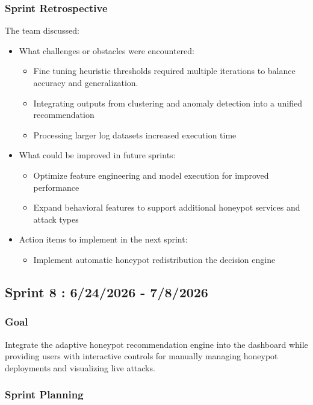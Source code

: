 \documentclass{article}
\begin{document}
\subsubsection{Sprint Retrospective}
The team discussed:

\begin{itemize}
    \item What challenges or obstacles were encountered:
    \begin{itemize}
        \item Fine tuning heuristic thresholds required multiple iterations to balance accuracy and generalization.
        \item Integrating outputs from clustering and anomaly detection into a unified recommendation 
        \item Processing larger log datasets increased execution time 
    \end{itemize}

    \item What could be improved in future sprints:
    \begin{itemize}
        \item Optimize feature engineering and model execution for improved performance
        \item Expand behavioral features to support additional honeypot services and attack types
    \end{itemize}
    
    \item Action items to implement in the next sprint:
    \begin{itemize}
        \item Implement automatic honeypot redistribution the decision engine
    \end{itemize}
\end{itemize}



\subsection{Sprint 8 : 6/24/2026 - 7/8/2026}
\subsubsection{Goal}
Integrate the adaptive honeypot recommendation engine into the dashboard while providing users with interactive controls for manually managing honeypot deployments and visualizing live attacks.


\subsubsection{Sprint Planning}
\end{document}
